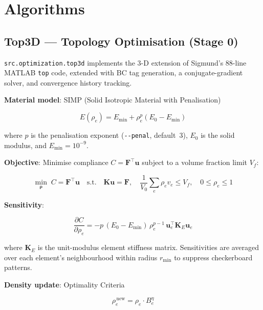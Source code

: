 \documentclass[a4paper, 11pt, openany]{report}
\begin{document}
\section{Algorithms}
\label{sec:algorithms}

\subsection{Top3D --- Topology Optimisation (Stage 0)}
\label{sec:alg-top3d}

\texttt{src.optimization.top3d} implements the 3-D extension of Sigmund's
88-line MATLAB \texttt{top} code, extended with BC tag generation, a
conjugate-gradient solver, and convergence history tracking.

\textbf{Material model}: SIMP (Solid Isotropic Material with Penalisation)

\begin{equation}
\label{eq:simp}
E(\rho_e) = E_{\min} + \rho_e^p (E_0 - E_{\min})
\end{equation}

where $p$ is the penalisation exponent (\texttt{-{}-penal}, default~3),
$E_0$ is the solid modulus, and $E_{\min} = 10^{-9}$.

\textbf{Objective}: Minimise compliance $C = \mathbf{F}^\top \mathbf{u}$
subject to a volume fraction limit $V_f$:

\begin{equation}
\label{eq:top3d-obj}
\min_{\boldsymbol{\rho}} \; C = \mathbf{F}^\top \mathbf{u}
\quad \text{s.t.} \quad
\mathbf{K}\mathbf{u} = \mathbf{F}, \quad
\frac{1}{V_0}\sum_e \rho_e v_e \le V_f, \quad
0 \le \rho_e \le 1
\end{equation}

\textbf{Sensitivity}:

\begin{equation}
\label{eq:sensitivity}
\frac{\partial C}{\partial \rho_e}
= -p\,(E_0 - E_{\min})\,\rho_e^{p-1}\,
  \mathbf{u}_e^\top \mathbf{K}_E \mathbf{u}_e
\end{equation}

where $\mathbf{K}_E$ is the unit-modulus element stiffness matrix.
Sensitivities are averaged over each element's neighbourhood within radius
$r_{\min}$ to suppress checkerboard patterns.

\textbf{Density update}: Optimality Criteria

\begin{equation}
\label{eq:oc-update}
\rho_e^{\,\text{new}} = \rho_e \cdot B_e^{\eta}
\end{equation}
\end{document}
